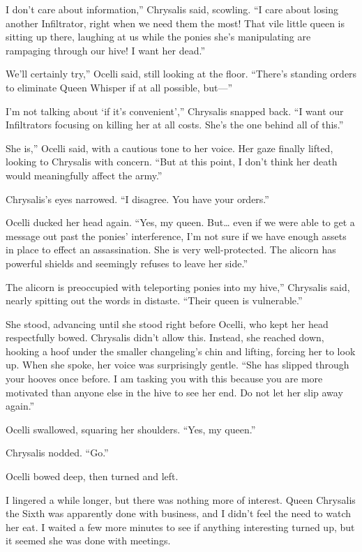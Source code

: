 \leavevmode{}I don’t care about information,” Chrysalis said, scowling. “I care about losing another Infiltrator, right when we need them the most! That vile little queen is sitting up there, laughing at us while the ponies she’s manipulating are rampaging through our hive! I want her dead.”

\leavevmode{}We’ll certainly try,” Ocelli said, still looking at the floor. “There’s standing orders to eliminate Queen Whisper if at all possible, but—”

\leavevmode{}I’m not talking about ‘if it’s convenient’,” Chrysalis snapped back. “I want our Infiltrators focusing on killing her at all costs. She’s the one behind all of this.”

\leavevmode{}She is,” Ocelli said, with a cautious tone to her voice. Her gaze finally lifted, looking to Chrysalis with concern. “But at this point, I don’t think her death would meaningfully affect the army.”

Chrysalis’s eyes narrowed. “I disagree. You have your orders.”

Ocelli ducked her head again. “Yes, my queen. But… even if we were able to get a message out past the ponies’ interference, I’m not sure if we have enough assets in place to effect an assassination. She is very well-protected. The alicorn has powerful shields and seemingly refuses to leave her side.”

\leavevmode{}The alicorn is preoccupied with teleporting ponies into my hive,” Chrysalis said, nearly spitting out the words in distaste. “Their queen is vulnerable.”

She stood, advancing until she stood right before Ocelli, who kept her head respectfully bowed. Chrysalis didn’t allow this. Instead, she reached down, hooking a hoof under the smaller changeling’s chin and lifting, forcing her to look up. When she spoke, her voice was surprisingly gentle. “She has slipped through your hooves once before. I am tasking you with this because you are more motivated than anyone else in the hive to see her end. Do not let her slip away again.”

Ocelli swallowed, squaring her shoulders. “Yes, my queen.”

Chrysalis nodded. “Go.”

Ocelli bowed deep, then turned and left.

I lingered a while longer, but there was nothing more of interest. Queen Chrysalis the Sixth was apparently done with business, and I didn’t feel the need to watch her eat. I waited a few more minutes to see if anything interesting turned up, but it seemed she was done with meetings.

